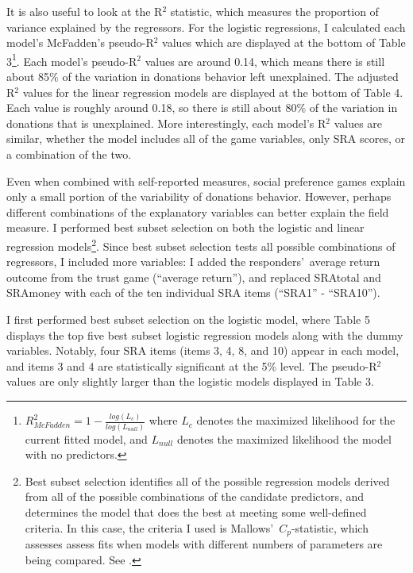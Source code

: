 \documentclass[12pt]{article}
\begin{document}
It is also useful to look at the R$^{2}$ statistic, which measures the proportion of variance explained by the regressors. For the logistic regressions, I calculated each model\rq s McFadden\rq s pseudo-R$^{2}$ values which are displayed at the bottom of Table 3\footnote{
\(R^{2}_{McFadden} = 1 - \frac{log(L_{c})}{log(L_{null})}\)
where \(L_{c}\) denotes the maximized likelihood for the current fitted model, and \(L_{null}\) denotes the maximized likelihood the model with no predictors.
}. Each model\rq s pseudo-R$^{2}$ values are around 0.14, which means there is still about 85\% of the variation in donations behavior left unexplained. The adjusted R$^{2}$ values for the linear regression models are displayed at the bottom of Table 4. Each value is roughly around 0.18, so there is still about 80\% of the variation in donations that is unexplained. More interestingly, each model\rq s R$^{2}$ values are similar, whether the model includes all of the game variables, only SRA scores, or a combination of the two.


Even when combined with self-reported measures, social preference games explain only a small portion of the variability of donations behavior. However, perhaps different combinations of the explanatory variables can better explain the field measure. I performed best subset selection on both the logistic and linear regression models\footnote{Best subset selection identifies all of the possible regression models derived from all of the possible combinations of the candidate predictors, and determines the model that does the best at meeting some well-defined criteria. In this case, the criteria I used is Mallows\rq \ \(C_{p}\)-statistic, which assesses assess fits when models with different numbers of parameters are being compared.  See \cite{mallows_1973}.}. Since best subset selection tests all possible combinations of regressors, I included more variables: I added the responders\rq \ average return outcome from the trust game (``average return''), and replaced SRAtotal and SRAmoney with each of the ten individual SRA items (``SRA1'' - ``SRA10''). 

I first performed best subset selection on the logistic model, where Table 5 displays the top five best subset logistic regression models along with the dummy variables. Notably, four SRA items (items 3, 4, 8, and 10) appear in each model, and items 3 and 4 are statistically significant at the 5\% level. The pseudo-R$^{2}$ values are only slightly larger than the logistic models displayed in Table 3.
\end{document}
